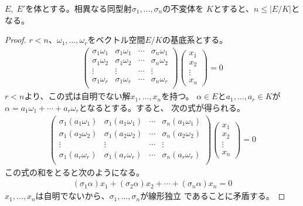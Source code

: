 {	\begin{proposition}[Artinの工夫]\label{prop:Artinの工夫} %
		$E,\;E'$を体とする。相異なる同型射$\sigma_1,\dots,\sigma_n$の不変体を
		$K$とすると、$n\le|E/K|$となる。
	\end{proposition} %
	\begin{proof} %
		$r<n$、$\omega_1,\dots,\omega_r$をベクトル空間$E/K$の基底系とする。
		\begin{equation*}\begin{split}
			\begin{pmatrix}
				\sigma_1\omega_1 & \sigma_1\omega_1 &\cdots& \sigma_n\omega_1 \\
				\sigma_1\omega_2 & \sigma_1\omega_2 &\cdots& \sigma_n\omega_2 \\
				\vdots & \vdots &\cdots& \vdots \\
				\sigma_1\omega_r & \sigma_1\omega_r &\cdots& \sigma_n\omega_r \\
			\end{pmatrix}\begin{pmatrix}
				x_1 \\ x_2 \\ \vdots \\ x_n
			\end{pmatrix} = 0
		\end{split}\end{equation*}
		$r<n$より、この式は自明でない解$x_1,\dots,x_n$を持つ。
		$\alpha\in E$と$a_1,\dots,a_r\in K$が
		$\alpha=a_1\omega_1+\cdots+a_r\omega_r$となるとする。すると、
		次の式が得られる。
		\begin{equation*}\begin{split}
			\begin{pmatrix}
				\sigma_1(a_1\omega_1) & \sigma_1(a_1\omega_1) 
					&\cdots& \sigma_n(a_1\omega_1) \\
				\sigma_1(a_2\omega_2) & \sigma_1(a_2\omega_2) 
					&\cdots& \sigma_n(a_2\omega_2) \\
				\vdots & \vdots &\cdots& \vdots \\
				\sigma_1(a_r\omega_r) & \sigma_1(a_r\omega_r) 
					&\cdots& \sigma_n(a_r\omega_r) \\
			\end{pmatrix}\begin{pmatrix}
				x_1 \\ x_2 \\ \vdots \\ x_n
			\end{pmatrix} = 0
		\end{split}\end{equation*}
		この式の和をとると次のようになる。
		\begin{equation*}\begin{split}
			(\sigma_1\alpha)x_1 + (\sigma_2\alpha)x_2
			+\cdots+ (\sigma_n\alpha)x_n = 0
		\end{split}\end{equation*}
		$x_1,\dots,x_n$は自明でないから、$\sigma_1,\dots,\sigma_n$が線形独立
		であることに矛盾する。
	\end{proof} %

}

